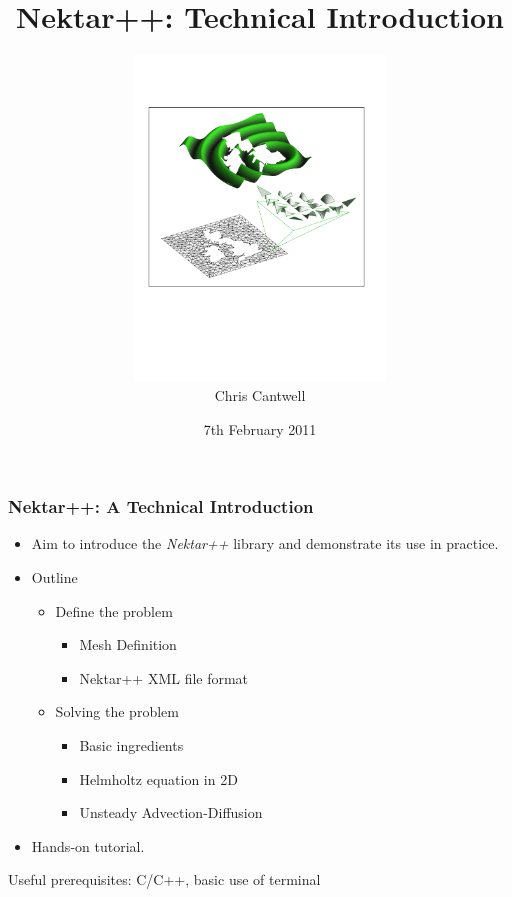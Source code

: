 \documentclass{beamer}
\title{Nektar++: Technical Introduction}
\author{\includegraphics[width=0.5\textwidth,trim=10mm 70mm 15mm 40mm,clip]
{title.pdf}\\Chris Cantwell}
\date{7th February 2011}
\numberwithin{figure}{section}
\numberwithin{equation}{section}
\begin{document}
\frame{\titlepage}


\begin{frame}
\frametitle{Nektar++: A Technical Introduction}
\begin{minipage}[c][0.8\textheight][t]{\linewidth}
\begin{itemize}
  \item Aim to introduce the \emph{Nektar++} library and demonstrate its use in
  practice.
  \item Outline
  \bigskip
  \begin{itemize}
  \item Define the problem
  \begin{itemize}
    \item Mesh Definition
    \item Nektar++ XML file format
  \end{itemize}
  \item Solving the problem
  \begin{itemize}
    \item Basic ingredients
    \item Helmholtz equation in 2D
    \item Unsteady Advection-Diffusion
  \end{itemize}
  \end{itemize}
  \bigskip
  \item Hands-on tutorial.
\end{itemize}
\bigskip
\bigskip
Useful prerequisites: C/C++, basic use of terminal
\end{minipage}
\end{frame}
\end{document}
